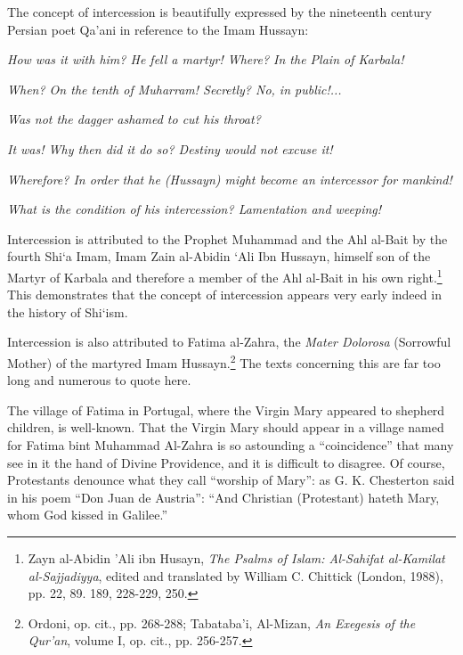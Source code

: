 The concept of intercession is beautifully expressed by the nineteenth century Persian poet Qa'ani in reference to the Imam Hussayn:

\begin{quotex}
\emph{How was it with him? He fell a martyr! Where? In the Plain of Karbala!}

\emph{When? On the tenth of Muharram! Secretly? No, in public!... }

\emph{Was not the dagger ashamed to cut his throat?}

\emph{It was! Why then did it do so? Destiny would not excuse it!}

\emph{Wherefore? In order that he (Hussayn) might become an intercessor for mankind!}

\emph{What is the condition of his intercession? Lamentation and weeping!}

\end{quotex}


Intercession is attributed to the Prophet Muhammad and the Ahl al-Bait by the fourth Shi`a Imam, Imam Zain al-Abidin `Ali Ibn Hussayn, himself son of the Martyr of Karbala and therefore a member of the Ahl al-Bait in his own right.\footnote{Zayn al-Abidin 'Ali ibn Husayn, \emph{The Psalms of Islam: Al-Sahifat al-Kamilat al-Sajjadiyya}, edited and translated by William C. Chittick (London, 1988), pp. 22, 89. 189, 228-229, 250.} This demonstrates that the concept of intercession appears very early indeed in the history of Shi`ism.

Intercession is also attributed to Fatima al-Zahra, the \emph{Mater Dolorosa} (Sorrowful Mother) of the martyred Imam Hussayn.\footnote{Ordoni, op. cit., pp. 268-288; Tabataba'i, Al-Mizan, \emph{An Exegesis of the Qur'an}, volume I, op. cit., pp. 256-257.} The texts concerning this are far too long and numerous to quote here.

The village of Fatima in Portugal, where the Virgin Mary appeared to shepherd children, is well-known. That the Virgin Mary should appear in a village named for Fatima bint Muhammad Al-Zahra is so astounding a ``coincidence'' that many see in it the hand of Divine Providence, and it is difficult to disagree. Of course, Protestants denounce what they call ``worship of Mary'': as G. K. Chesterton said in his poem ``Don Juan de Austria'': ``And Christian (Protestant) hateth Mary, whom God kissed in Galilee.''

